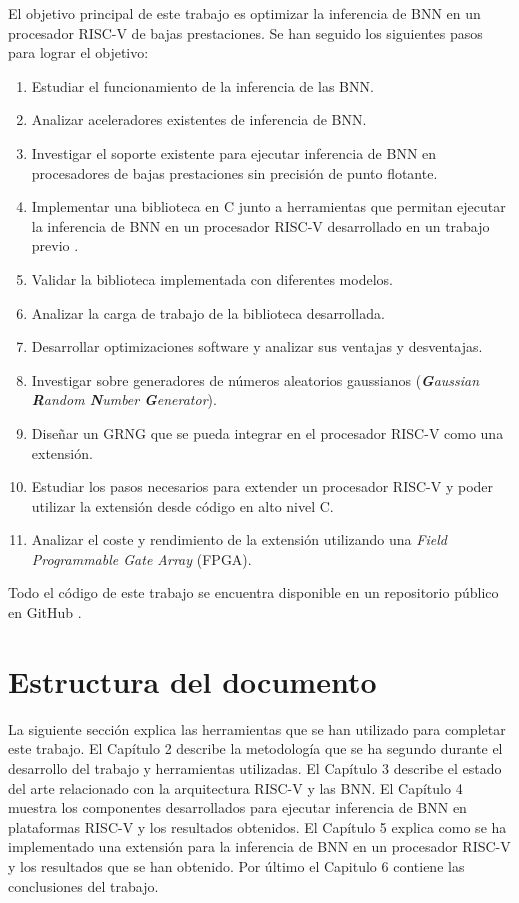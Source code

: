 El objetivo principal de este trabajo es optimizar la inferencia de BNN en un procesador RISC-V de bajas prestaciones. Se han seguido los siguientes pasos para lograr el objetivo:
\begin{enumerate}
    \item Estudiar el funcionamiento de la inferencia de las BNN.
    \item Analizar aceleradores existentes de inferencia de BNN.
    \item Investigar el soporte existente para ejecutar inferencia de BNN en procesadores de bajas prestaciones sin precisión de punto flotante.
    \item Implementar una biblioteca en C junto a herramientas que permitan ejecutar la inferencia de BNN en un procesador RISC-V desarrollado en un trabajo previo \cite{riscv_tfg}.
    \item Validar la biblioteca implementada con diferentes modelos.
    \item Analizar la carga de trabajo de la biblioteca desarrollada.
    \item Desarrollar optimizaciones software y analizar sus ventajas y desventajas.
    \item Investigar sobre generadores de números aleatorios gaussianos (\textit{\textbf{G}aussian \textbf{R}andom \textbf{N}umber \textbf{G}enerator}).
    \item Diseñar un GRNG que se pueda integrar en el procesador RISC-V como una extensión.
    \item Estudiar los pasos necesarios para extender un procesador RISC-V y poder utilizar la extensión desde código en alto nivel C.
    \item Analizar el coste y rendimiento de la extensión utilizando una \textit{Field Programmable Gate Array} (FPGA).
\end{enumerate}

Todo el código de este trabajo se encuentra disponible en un repositorio público en GitHub \cite{bnn_github}.


\section{Estructura del documento}

\todo La siguiente sección explica las herramientas que se han utilizado para completar este trabajo. El Capítulo 2 describe la metodología que se ha segundo durante el desarrollo del trabajo y herramientas utilizadas. El Capítulo 3 describe el estado del arte relacionado con la arquitectura RISC-V y las BNN. El Capítulo 4 muestra los componentes desarrollados para ejecutar inferencia de BNN en plataformas RISC-V y los resultados obtenidos. El Capítulo 5 explica como se ha implementado una extensión para la inferencia de BNN en un procesador RISC-V y los resultados que se han obtenido. Por último el Capitulo 6 contiene las conclusiones del trabajo.

